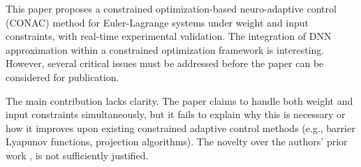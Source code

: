 \documentclass[12pt,english]{reviewresponse}
\begin{document}
\reviewer
\begin{generalcomment}
	This paper proposes a constrained optimization-based neuro-adaptive control (CONAC) method for Euler-Lagrange systems under weight and input constraints, with real-time experimental validation. The integration of DNN approximation within a constrained optimization framework is interesting. However, several critical issues must be addressed before the paper can be considered for publication.
\end{generalcomment}

% 
\begin{revcomment}[1][1]{}
	The main contribution lacks clarity. The paper claims to handle both weight and input constraints simultaneously, but it fails to explain why this is necessary or how it improves upon existing constrained adaptive control methods (e.g., barrier Lyapunov functions, projection algorithms). The novelty over the authors’ prior work \cite{Ryu:2025aa}, \cite{Ryu:2025ab} is not sufficiently justified.
\end{revcomment}
\end{document}
